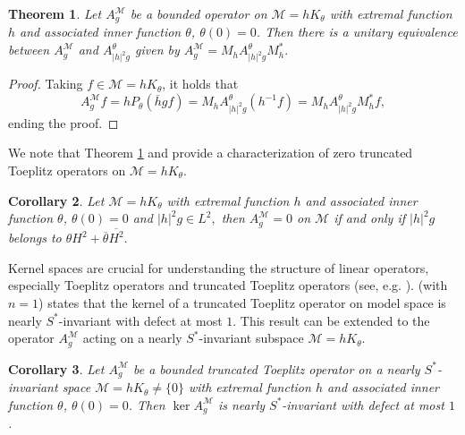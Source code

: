 \documentclass[12pt,reqno]{amsart}
\newtheorem{thm}{Theorem}[section]
\newtheorem{cor}[thm]{Corollary}
\theoremstyle{definition}
\theoremstyle{remark}
\numberwithin{equation}{section}
\newcommand{\ol}{\overline}
\newcommand{\ma}{\mathcal}
\begin{document}
\begin{thm}\label{Mtheta} Let $A_g^\ma{M}$ be a bounded operator on $\ma{M}=hK_\theta$ with extremal function $h$ and associated inner function $\theta$, $\theta(0)=0$.  Then there is a unitary equivalence between $A^\ma{M}_g$ and $A^\theta_{|h|^2g}$ given by $A_g^\ma{M} = M_hA^\theta_{|h|^2g}M_h^*.$\end{thm}

\begin{proof} Taking $f \in \ma{M}=hK_\theta$, it holds that $$A^\ma{M}_gf = hP_\theta (\ol{h}gf) = M_hA^\theta_{|h|^2 g}(h^{-1} f)= M_h A_{|h|^2g}^\theta M_h^* f,$$ ending the proof.\end{proof}

We note that Theorem \ref{Mtheta} and \cite[Theorem 3.1]{Sarason1} provide a characterization of  zero truncated Toeplitz operators on $\ma{M}=hK_\theta$.

\begin{cor} Let $\ma{M}=hK_\theta$ with extremal function $h$ and associated inner function $\theta$, $\theta(0)=0$ and $|h|^2g\in L^2,$ then $A_g^\ma{M}=0$ on $\ma{M}$  if and only if $|h|^2g$ belongs to $\theta H^2+\ol{\theta}\ol{H^2}.$
\end{cor}

Kernel spaces are crucial for understanding the structure of linear operators, especially Toeplitz operators and truncated Toeplitz operators (see, e.g. \cite{CaP,Sarason1}).  \cite[Corollary 3.2]{Lou} (with $n=1$) states that the kernel of a truncated Toeplitz operator on model space is nearly $S^*$-invariant with defect at most $1$. This result can be extended to the operator $A^\ma{M}_g$ acting on a nearly $S^*$-invariant subspace $\ma{M}=hK_\theta$.

\begin{cor} Let $A^\ma{M}_g$ be a bounded truncated Toeplitz operator on a nearly $S^*$-invariant space $\ma{M} = hK_\theta \neq \{0\}$ with extremal function $h$ and associated inner function $\theta$, $\theta(0)=0$. Then $\ker A^\ma{M}_g$
is nearly $S^*$-invariant with defect at most $1$. \end{cor}
\end{document}
